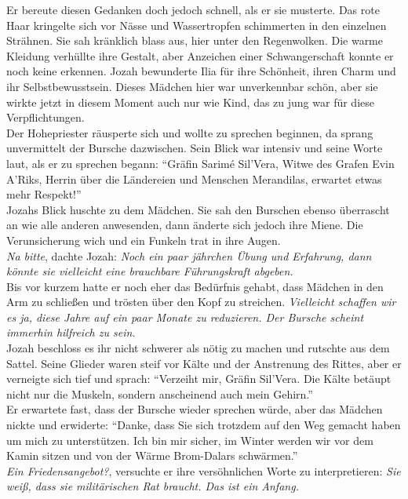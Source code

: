 Er bereute diesen Gedanken doch jedoch schnell, als er sie musterte. Das rote Haar kringelte sich 
vor Nässe und Wassertropfen schimmerten in den einzelnen Strähnen. Sie sah kränklich blass aus, 
hier unter den Regenwolken. Die warme Kleidung verhüllte ihre Gestalt, aber Anzeichen einer 
Schwangerschaft konnte er noch keine erkennen. Jozah bewunderte Ilia für ihre Schönheit, ihren 
Charm und ihr Selbstbewusstsein. Dieses Mädchen hier war unverkennbar schön, aber sie wirkte jetzt 
in diesem Moment auch nur wie Kind, das zu jung war für diese Verpflichtungen.\\
Der Hohepriester räusperte sich und wollte zu sprechen beginnen, da sprang unvermittelt der Bursche 
dazwischen. Sein Blick war intensiv und seine Worte laut, als er zu sprechen begann: ``Gräfin 
Sarimé Sil'Vera, Witwe des Grafen Evin A'Riks, Herrin über die Ländereien und Menschen Merandilas, 
erwartet etwas mehr Respekt!''\\
Jozahs Blick huschte zu dem Mädchen. Sie sah den Burschen ebenso überrascht an wie alle anderen 
anwesenden, dann änderte sich jedoch ihre Miene. Die Verunsicherung wich und ein Funkeln trat in 
ihre Augen.\\
\textit{Na bitte}, dachte Jozah: \textit{Noch ein paar jährchen Übung und Erfahrung, dann könnte 
sie vielleicht eine brauchbare Führungskraft abgeben.}\\
Bis vor kurzem hatte er noch eher das Bedürfnis gehabt, dass Mädchen in den Arm zu schließen und 
trösten über den Kopf zu streichen. \textit{Vielleicht schaffen wir es ja, diese Jahre auf ein paar 
Monate zu reduzieren. Der Bursche scheint immerhin hilfreich zu sein.}\\
Jozah beschloss es ihr nicht schwerer als nötig zu machen und rutschte aus dem Sattel. Seine 
Glieder waren steif vor Kälte und der Anstrenung des Rittes, aber er verneigte sich tief und 
sprach: ``Verzeiht mir, Gräfin Sil'Vera. Die Kälte betäupt nicht nur die Muskeln, sondern 
anscheinend auch mein Gehirn.''\\
Er erwartete fast, dass der Bursche wieder sprechen würde, aber das Mädchen nickte und erwiderte: 
``Danke, dass Sie sich trotzdem auf den Weg gemacht haben um mich zu unterstützen. Ich bin mir 
sicher, im Winter werden wir vor dem Kamin sitzen und von der Wärme Brom-Dalars schwärmen.''\\
\textit{Ein Friedensangebot?}, versuchte er ihre versöhnlichen Worte zu interpretieren: \textit{Sie 
weiß, dass sie militärischen Rat braucht. Das ist ein Anfang.}\\

